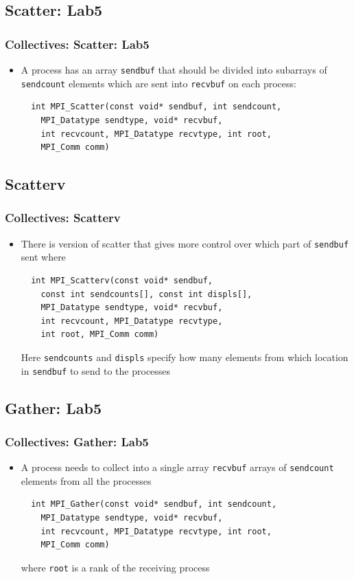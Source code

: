\documentclass{beamer}
\begin{document}
\subsection{Scatter: Lab5}
\begin{frame}[fragile]
  \frametitle{Collectives: Scatter: Lab5}
\begin{itemize}
\item A process has an array {\color{mycolorcode}\verb|sendbuf|} that should be divided into subarrays of {\color{mycolorcode}\verb|sendcount|} elements which are sent into {\color{mycolorcode}\verb|recvbuf|} on each process:
{\color{mycolorcode}
\begin{verbatim}
  int MPI_Scatter(const void* sendbuf, int sendcount, 
    MPI_Datatype sendtype, void* recvbuf, 
    int recvcount, MPI_Datatype recvtype, int root,
    MPI_Comm comm)
\end{verbatim}
}
\end{itemize}
\end{frame}

\subsection{Scatterv}
\begin{frame}[fragile]
  \frametitle{Collectives: Scatterv}
\begin{itemize}
\item There is version of scatter that gives more control over which part of {\color{mycolorcode}\verb|sendbuf|} sent where
{\color{mycolorcode}
\begin{verbatim}
  int MPI_Scatterv(const void* sendbuf, 
    const int sendcounts[], const int displs[], 
    MPI_Datatype sendtype, void* recvbuf, 
    int recvcount, MPI_Datatype recvtype, 
    int root, MPI_Comm comm)
\end{verbatim}
}
Here {\color{mycolorcode}\verb|sendcounts|} and {\color{mycolorcode}\verb|displs|} specify how many elements from which location in {\color{mycolorcode}\verb|sendbuf|} to send to the processes
\end{itemize}
\end{frame}



\subsection{Gather: Lab5}
\begin{frame}[fragile]
  \frametitle{Collectives: Gather: Lab5}
\begin{itemize}
\item A process needs to collect into a single array {\color{mycolorcode}\verb|recvbuf|} arrays of {\color{mycolorcode}\verb|sendcount|} elements from all the processes
{\color{mycolorcode}
\begin{verbatim}
  int MPI_Gather(const void* sendbuf, int sendcount, 
    MPI_Datatype sendtype, void* recvbuf, 
    int recvcount, MPI_Datatype recvtype, int root,
    MPI_Comm comm)
\end{verbatim}
}
where {\color{mycolorcode}\verb|root|} is a rank of the receiving process
\end{itemize}
\end{frame}
\end{document}

